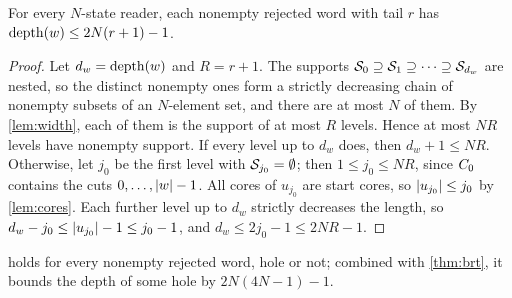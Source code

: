 \begin{theorem}\label{thm:depth}
For every $N$-state reader, each nonempty rejected word with tail $r$ has
$\operatorname{depth}(w) \le 2N(r+1)-1$.
\end{theorem}

\begin{proof}
Let $d_w = \operatorname{depth}(w)$ and $R = r+1$. The supports $\mathcal S_0 \supseteq \mathcal S_1 \supseteq
\cdots \supseteq \mathcal S_{d_w}$ are nested, so the distinct nonempty ones form a strictly
decreasing chain of nonempty subsets of an $N$-element set, and there are at most $N$
of them. By \cref{lem:width}, each of them is the support of at most $R$ levels. Hence at
most $N R$ levels have nonempty support. If every level up to $d_w$ does, then
$d_w + 1 \le N R$. Otherwise, let $j_0$ be the first level with $\mathcal S_{j_0} = \emptyset$;
then $1 \le j_0 \le N R$, since $C_0$ contains the cuts $0,\dots,\lvert w\rvert-1$. All cores
of $u_{j_0}$ are start cores, so $\lvert u_{j_0}\rvert \le j_0$ by \cref{lem:cores}. Each further
level up to $d_w$ strictly decreases the length, so $d_w - j_0 \le \lvert u_{j_0}\rvert - 1 \le j_0 - 1$,
and $d_w \le 2j_0 - 1 \le 2N R - 1$.
\end{proof}



 holds for every nonempty rejected word, hole or not; combined with
\cref{thm:brt}, it bounds the depth of some hole by $2N(4N-1)-1$.
